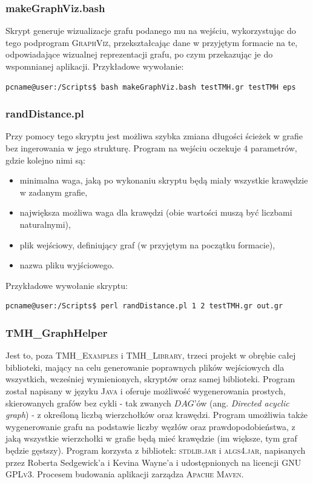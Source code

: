 \subsubsection{makeGraphViz.bash}

Skrypt generuje wizualizacje grafu podanego mu na wejściu, wykorzystując do tego podprogram \textsc{GraphViz}, przekształcając dane w przyjętym formacie na te, odpowiadające wizualnej reprezentacji grafu, po czym przekazując je do wspomnianej aplikacji. Przykładowe wywołanie:

\begin{lstlisting}[language=bash]
pcname@user:/Scripts$ bash makeGraphViz.bash testTMH.gr testTMH eps
\end{lstlisting}

\subsubsection{randDistance.pl}

Przy pomocy tego skryptu jest możliwa szybka zmiana długości ścieżek w grafie bez ingerowania w jego strukturę. Program na wejściu oczekuje $4$ parametrów, gdzie kolejno nimi są:

\begin{itemize}
\item minimalna waga, jaką po wykonaniu skryptu będą miały wszystkie krawędzie w zadanym grafie,
\item największa możliwa waga dla krawędzi (obie wartości muszą być liczbami naturalnymi),
\item plik wejściowy, definiujący graf (w przyjętym na początku formacie),
\item nazwa pliku wyjściowego.
\end{itemize}

Przykładowe wywołanie skryptu:

\begin{lstlisting}[language=bash]
pcname@user:/Scripts$ perl randDistance.pl 1 2 testTMH.gr out.gr
\end{lstlisting}

\subsubsection{TMH\_GraphHelper}

Jest to, poza \textsc{TMH\_Examples} i \textsc{TMH\_Library}, trzeci projekt w obrębie całej biblioteki, mający na celu generowanie poprawnych plików wejściowych dla wszystkich, wcześniej wymienionych, skryptów oraz samej biblioteki. Program został napisany w języku \textsc{Java} i oferuje możliwość wygenerowania prostych, skierowanych grafów bez cykli - tak zwanych $DAG$'ów (ang. \textit{Directed acyclic graph}) - z określoną liczbą wierzchołków oraz krawędzi. Program umożliwia także wygenerowanie grafu na podstawie liczby węzłów oraz prawdopodobieństwa, z jaką wszystkie wierzchołki w grafie będą mieć krawędzie (im większe, tym graf będzie gęstszy). Program korzysta z bibliotek: \textsc{stdlib.jar} i \textsc{algs4.jar}, napisanych przez Roberta Sedgewick'a i Kevina Wayne'a i udostępnionych na licencji \textsc{GNU GPLv3}. Procesem budowania aplikacji zarządza \textsc{Apache Maven}.

